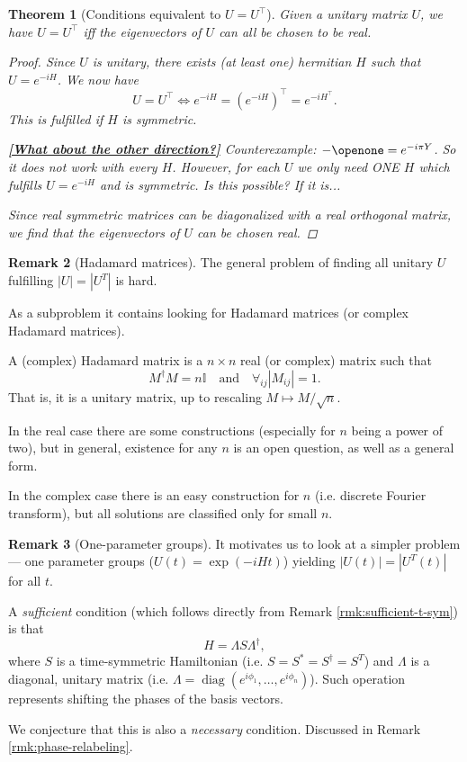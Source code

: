 \documentclass[aps,pra,12pt,nofootinbib,superscriptaddress,longbibliography,showpacs]{revtex4-1}
\newcommand{\todo}[1]{\textbf{\underline{\textcolor{dblue}{\textbf{[}#1\textbf{]}}}}}
\theoremstyle{plain}
\newtheorem{theorem}{Theorem}   %
\theoremstyle{definition}
\newtheorem{remark}[theorem]{Remark}
\newcommand{\eq}{\Leftrightarrow}
\DeclareMathOperator{\diag}{diag}
\newcommand{\I}{\openone}     %
\newcommand{\be}{\begin{equation}}
\newcommand{\ee}{\end{equation}}
\begin{document}
\begin{theorem}[Conditions equivalent to $U=U^\top$]
\label{theorem:real}
Given a unitary matrix $U$, we have $U=U^\top$ iff the eigenvectors of $U$ can
all be chosen to be real.
\begin{proof}
Since $U$ is unitary, there exists (at least one) hermitian $H$ such that $U = e^{-iH}$.
We now have
\be
U = U^\top
\eq
e^{-iH} = (e^{-iH})^\top = e^{-i H^\top}.
\ee
This is fulfilled if $H$ is symmetric.

\todo{What about the other direction?}
Counterexample:
$-\I = e^{-i \pi Y}$. So it does not work with every $H$.
However, for each $U$ we only need ONE $H$ which fulfills $U =
e^{-iH}$ and is symmetric. Is this possible? If it is...


Since real symmetric matrices can be diagonalized with a real
orthogonal matrix, we find that the eigenvectors of $U$ can be chosen real.
\end{proof} 
\end{theorem} 


\begin{remark}[Hadamard matrices]
The general problem of finding all unitary $U$ fulfilling $|U|=|U^T|$ is hard. 

As a subproblem it contains looking for Hadamard matrices (or complex Hadamard matrices).

A (complex) Hadamard matrix is a $n \times n$ real (or complex) matrix such that
\begin{equation}
M^\dagger M = n \mathbb{I} \quad
\text{and} \quad \forall_{ij} |M_{ij}| = 1.
\end{equation}  
That is, it is a unitary matrix, up to rescaling $M \mapsto M/\sqrt{n}$.

In the real case there are some constructions (especially for $n$ being a power of two), but in general, existence for any $n$ is an open question, as well as a general form.

In the complex case there is an easy construction for $n$ (i.e. discrete Fourier transform), but all solutions are classified only for small $n$.

\end{remark}

\begin{remark}[One-parameter groups]

It motivates us to look at a simpler problem --- one parameter groups ($U(t) = \exp(-i H t)$)  yielding $|U(t)| = |U^T(t)|$ for all $t$.

A {\em sufficient} condition (which follows directly from Remark \ref{rmk:sufficient-t-sym}) is that
\begin{equation}
H = \Lambda S \Lambda^\dagger,
\end{equation}
where $S$ is a time-symmetric Hamiltonian
(i.e. $S=S^*=S^\dagger=S^T$)
and $\Lambda$ is a diagonal, unitary matrix
(i.e. $\Lambda = \diag(e^{i \phi_1}, \ldots, e^{i \phi_n})$).
Such operation represents shifting the phases of the basis vectors.

We conjecture that this is also a {\em necessary} condition. Discussed in Remark \ref{rmk:phase-relabeling}.
\end{remark}
\end{document}
